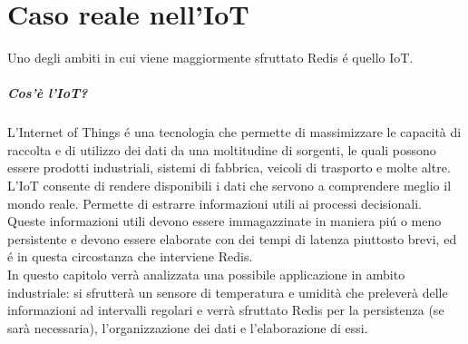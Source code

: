 \chapter{Caso reale nell'IoT}
Uno degli ambiti in cui viene maggiormente sfruttato Redis é quello IoT.
\paragraph{Cos'è l'IoT?\\}
L'Internet of Things é una tecnologia che permette di massimizzare le capacità di raccolta e di utilizzo
dei dati da una moltitudine di sorgenti, le quali possono essere prodotti industriali, sistemi di fabbrica, veicoli
di trasporto e molte altre.\\
L'IoT consente di rendere disponibili i dati che servono a comprendere meglio il mondo reale.
Permette di estrarre informazioni utili ai processi decisionali.\\
Queste informazioni utili devono essere immagazzinate in maniera piú o meno persistente
e devono essere elaborate con dei tempi di latenza piuttosto brevi, ed é in questa circostanza che interviene Redis.
\\
In questo capitolo verrà analizzata una possibile applicazione in ambito industriale:
si sfrutterà un sensore di temperatura e umidità che preleverà delle informazioni ad intervalli regolari e
verrà sfruttato Redis per la persistenza (se sarà necessaria), l'organizzazione dei dati e l'elaborazione di essi.

